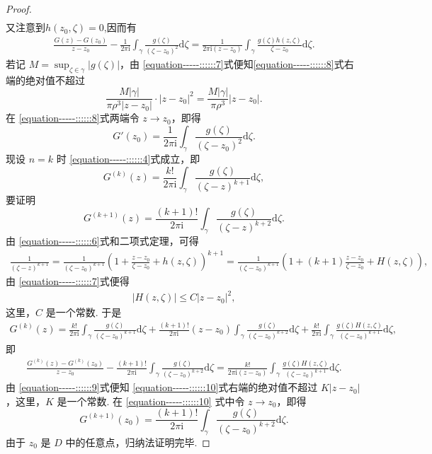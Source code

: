 \documentclass[../../main.tex]{subfiles}
\begin{document}
\begin{proof}
\begin{align*}
\end{align*}
又注意到$h(z_0,\zeta)=0$,因而有
\begin{align}
\frac{G(z) - G(z_0)}{z - z_0} - \frac{1}{2\pi \mathrm{i}} \int_{\gamma} \frac{g(\zeta)}{(\zeta - z_0)^2} \mathrm{d}\zeta  = \frac{1}{2\pi \mathrm{i} (z - z_0)} \int_{\gamma} \frac{g(\zeta)h(z, \zeta)}{\zeta - z_0} \mathrm{d}\zeta. \label{equation-----::::::8}
\end{align}
若记 \( M = \sup_{\zeta \in \gamma} |g(\zeta)| \)，由 \eqref{equation-----::::::7}式便知\eqref{equation-----::::::8}式右端的绝对值不超过
\[
\frac{M |\gamma|}{\pi \rho^3 |z - z_0|} \cdot |z - z_0|^2 = \frac{M |\gamma|}{\pi \rho^3} |z - z_0|.
\]
在 \eqref{equation-----::::::8}式两端令 \( z \to z_0 \)，即得
\[
G'(z_0) = \frac{1}{2\pi \mathrm{i}} \int_{\gamma} \frac{g(\zeta)}{(\zeta - z_0)^2} \mathrm{d}\zeta.
\]
现设 \( n = k \) 时 \eqref{equation-----::::::4}式成立，即
\[
G^{(k)}(z) = \frac{k!}{2\pi \mathrm{i}} \int_{\gamma} \frac{g(\zeta)}{(\zeta - z)^{k + 1}} \mathrm{d}\zeta,
\]
要证明
\[
G^{(k + 1)}(z) = \frac{(k + 1)!}{2\pi \mathrm{i}} \int_{\gamma} \frac{g(\zeta)}{(\zeta - z)^{k + 2}} \mathrm{d}\zeta.
\]
由 \eqref{equation-----::::::6}式和二项式定理，可得
\begin{align*}
\frac{1}{(\zeta - z)^{k + 1}} = \frac{1}{(\zeta - z_0)^{k + 1}} \left( 1 + \frac{z - z_0}{\zeta - z_0} + h(z, \zeta) \right)^{k + 1} = \frac{1}{(\zeta - z_0)^{k + 1}} \left( 1 + (k + 1) \frac{z - z_0}{\zeta - z_0} + H(z, \zeta) \right),
\end{align*}
由 \eqref{equation-----::::::7}式便得
\begin{align}
|H(z, \zeta)| \leqslant C |z - z_0|^2, \label{equation-----::::::9}
\end{align}
这里，\( C \) 是一个常数. 于是
\begin{align*}
G^{(k)}(z) = \frac{k!}{2\pi \mathrm{i}} \int_{\gamma} \frac{g(\zeta)}{(\zeta - z_0)^{k + 1}} \mathrm{d}\zeta + \frac{(k + 1)!}{2\pi \mathrm{i}} (z - z_0) \int_{\gamma} \frac{g(\zeta)}{(\zeta - z_0)^{k + 2}} \mathrm{d}\zeta + \frac{k!}{2\pi \mathrm{i}} \int_{\gamma} \frac{g(\zeta)H(z, \zeta)}{(\zeta - z_0)^{k + 1}} \mathrm{d}\zeta,
\end{align*}
即
\begin{align}
\frac{G^{(k)}(z) - G^{(k)}(z_0)}{z - z_0} - \frac{(k + 1)!}{2\pi \mathrm{i}} \int_{\gamma} \frac{g(\zeta)}{(\zeta - z_0)^{k + 2}} \mathrm{d}\zeta = \frac{k!}{2\pi \mathrm{i} (z - z_0)} \int_{\gamma} \frac{g(\zeta)H(z, \zeta)}{(\zeta - z_0)^{k + 1}} \mathrm{d}\zeta. \label{equation-----::::::10}
\end{align}
由 \eqref{equation-----::::::9}式便知 \eqref{equation-----::::::10}式右端的绝对值不超过 \( K |z - z_0| \)，这里，\( K \) 是一个常数. 在 \eqref{equation-----::::::10} 式中令 \( z \to z_0 \)，即得
\[
G^{(k + 1)}(z_0) = \frac{(k + 1)!}{2\pi \mathrm{i}} \int_{\gamma} \frac{g(\zeta)}{(\zeta - z_0)^{k + 2}} \mathrm{d}\zeta.
\]
由于 \( z_0 \) 是 \( D \) 中的任意点，归纳法证明完毕. 

\end{proof}
\end{document}
